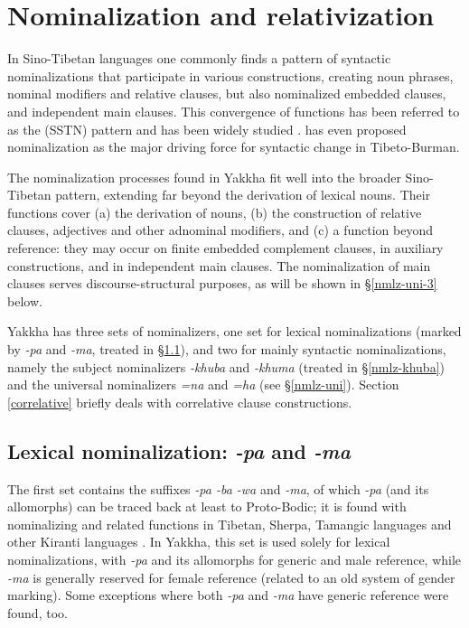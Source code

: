 
\chapter{Nominalization and relativization}\label{ch-nmlz}

In Sino-Tibetan languages one commonly finds a pattern of syntactic nominalizations that participate in various constructions, creating noun phrases, nominal modifiers and relative clauses, but also nominalized embedded clauses,  and independent main clauses. This convergence of functions has been referred to as the  (SSTN) pattern \citep[271]{Bickel1999Nominalization} and has been widely studied \citep{Matisoff1972Lahu, DeLancey1989Relativization, Genetti1992Semantic,  Genettietal2008_Nominalization, Saxena1992_Finite, Ebert1994The-structure, DeLancey1999Relativization, Bickel1999Nominalization, Watters2002A-grammar, Noonan2008_Nominalization, Doornenbal2008_Nominalization}. \citet{DeLancey2011_Finite} has even proposed nominalization as the major driving force for syntactic change in Tibeto-Burman. 
 
The nominalization processes found in Yakkha fit well into the broader Sino-Tibetan pattern, extending far beyond the derivation of lexical nouns. Their functions cover (a) the derivation of nouns, (b) the construction of relative clauses, adjectives and other adnominal modifiers, and (c) a function beyond  reference: they may occur on finite embedded complement clauses, in auxiliary constructions, and  in independent main clauses. The nominalization of  main clauses serves discourse-structural purposes, as will be shown in §\ref{nmlz-uni-3} below.

Yakkha has three sets of nominalizers, one set for lexical nominalizations (marked by \emph{-pa} and \emph{-ma}, treated in §\ref{nmlz-pa}), and two for mainly syntactic nominalizations, namely the subject nominalizers \emph{-khuba} and \emph{-khuma} (treated in §\ref{nmlz-khuba}) and the universal nominalizers \emph{=na} and \emph{=ha} (see §\ref{nmlz-uni}). Section \ref{correlative} briefly  deals with correlative clause constructions.


\section{Lexical nominalization: \emph{-pa} and \emph{-ma}}\label{nmlz-pa}

The first set contains the  suffixes \emph{-pa \ti -ba \ti -wa} and \emph{-ma}, of which \emph{-pa} (and its allomorphs) can be traced back at least to Proto-Bodic; it is found with nominalizing and related functions in Tibetan,  Sherpa,  Tamangic languages and other Kiranti languages \citep{DeLancey2002_Relativization, DeLancey2011_Finite, Genetti1992Semantic}. In Yakkha, this set is used solely for lexical nominalizations, with \emph{-pa} and its allomorphs for generic and male reference, while \emph{-ma} is generally reserved for female reference (related to an old system of gender marking). Some exceptions where both \emph{-pa} and \emph{-ma} have generic reference were found, too. 

